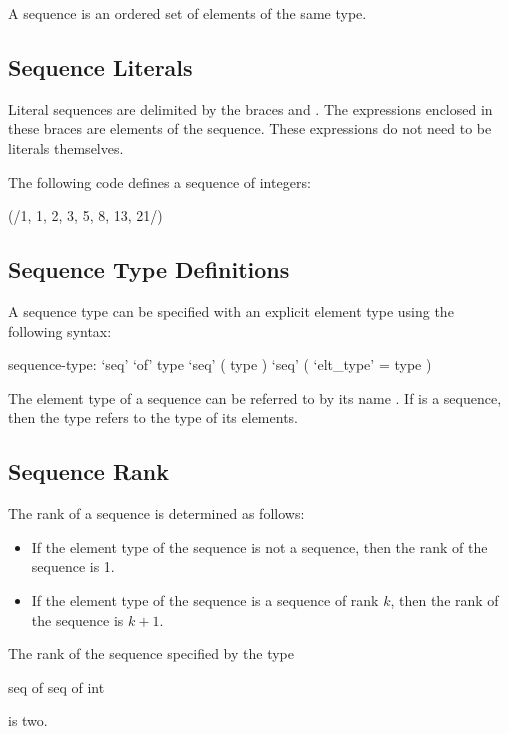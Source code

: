 \label{Sequences}

A sequence is an ordered set of elements of the same type.

\subsection{Sequence Literals}
\label{Sequence_Literals}

Literal sequences are delimited by the braces \chpl{(/} and \chpl{/)}.
The expressions enclosed in these braces are elements of the sequence.
These expressions do not need to be literals themselves.
\begin{example}
The following code defines a sequence of integers:
\begin{chapel}
(/1, 1, 2, 3, 5, 8, 13, 21/)
\end{chapel}
\end{example}

\subsection{Sequence Type Definitions}
\label{Sequence_Type_Definitions}

A sequence type can be specified with an explicit element type using
the following syntax:
\begin{syntax}
sequence-type:
  `seq' `of' type
  `seq' ( type )
  `seq' ( `elt_type' = type )
\end{syntax}

The element type of a sequence can be referred to by its
name .  If  is a sequence, then the
type  refers to the type of its elements.

\subsection{Sequence Rank}
\label{Sequence_Rank}

The rank of a sequence is determined as follows:
\begin{itemize}
\item
If the element type of the sequence is not a sequence, then the rank
of the sequence is 1.
\item
If the element type of the sequence is a sequence of rank $k$, then
the rank of the sequence is $k+1$.
\end{itemize}
\begin{example}
The rank of the sequence specified by the type
\begin{chapel}
  seq of seq of int
\end{chapel}
is two.
\end{example}

